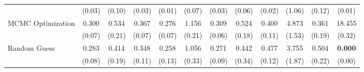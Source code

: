 \begin{table}[ht]
{\begin{tabular}{l cccc cccc cc c}
             & (0.03) & (0.10) & (0.03) & (0.01) & (0.07) & (0.03) & (0.06) & (0.02) & (1.06) & (0.12) & (0.01) \\
            \addlinespace[0.2em]
            MCMC Optimization & 0.300 & 0.534 & 0.367 & 0.276 & 1.156 & 0.309 & 0.524 & 0.400 & 4.873 & 0.361 & 18.455 \\
             & (0.07) & (0.21) & (0.07) & (0.07) & (0.21) & (0.06) & (0.18) & (0.11) & (1.53) & (0.19) & (0.32) \\
            \addlinespace[0.2em]
            Random Guess & 0.283 & 0.414 & 0.348 & 0.258 & 1.056 & 0.271 & 0.442 & 0.477 & 3.755 & 0.504 & \textbf{0.000} \\
             & (0.08) & (0.19) & (0.11) & (0.13) & (0.33) & (0.09) & (0.34) & (0.12) & (1.87) & (0.22) & (0.00) \\
            \bottomrule
        \end{tabular}%
    }
\end{table}